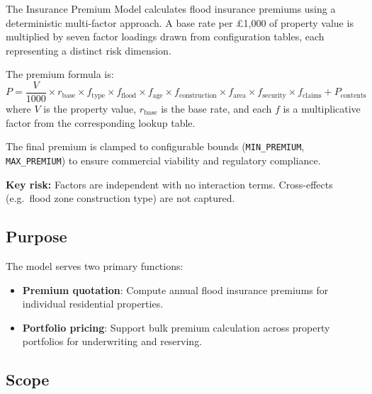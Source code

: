 \documentclass[11pt,a4paper]{article}
\begin{document}
\mkmtitlepage
\mkmlegalpage
\tableofcontents
\clearpage

\mkmexecsummary

The Insurance Premium Model calculates flood insurance premiums using a
deterministic multi-factor approach. A base rate per \pounds1,000 of property
value is multiplied by seven factor loadings drawn from configuration tables,
each representing a distinct risk dimension.

The premium formula is:
\[
    P = \frac{V}{1000} \times r_{\text{base}}
        \times f_{\text{type}} \times f_{\text{flood}} \times f_{\text{age}}
        \times f_{\text{construction}} \times f_{\text{area}}
        \times f_{\text{security}} \times f_{\text{claims}}
        + P_{\text{contents}}
\]
where $V$ is the property value, $r_{\text{base}}$ is the base rate, and each
$f$ is a multiplicative factor from the corresponding lookup table.

The final premium is clamped to configurable bounds (\texttt{MIN\_PREMIUM},
\texttt{MAX\_PREMIUM}) to ensure commercial viability and regulatory compliance.

\textbf{Key risk:} Factors are independent with no interaction terms. Cross-effects
(e.g.\ flood zone \texttimes{} construction type) are not captured.


\mkmpurpose

\subsection{Purpose}

The model serves two primary functions:
\begin{itemize}[nosep]
    \item \textbf{Premium quotation}: Compute annual flood insurance premiums for
          individual residential properties.
    \item \textbf{Portfolio pricing}: Support bulk premium calculation across
          property portfolios for underwriting and reserving.
\end{itemize}

\subsection{Scope}
\end{document}
